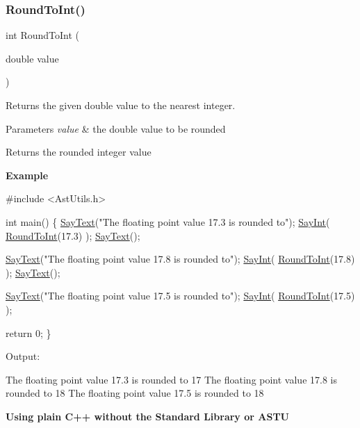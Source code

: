 \subsubsection{\texorpdfstring{Round\+To\+Int()}{RoundToInt()}}
{\footnotesize\ttfamily int Round\+To\+Int (\begin{DoxyParamCaption}\item[{double}]{value }\end{DoxyParamCaption})}

Returns the given double value to the nearest integer.


\begin{DoxyParams}{Parameters}
{\em value} & the double value to be rounded \\
\hline
\end{DoxyParams}
\begin{DoxyReturn}{Returns}
the rounded integer value
\end{DoxyReturn}
{\bfseries Example}


\begin{DoxyCode}
\textcolor{preprocessor}{#include <AstUtils.h>}

\textcolor{keywordtype}{int} main()
\{
  \hyperlink{group__io__group_ga82cdf45375c3b92b2a60c3d9b55d682f}{SayText}(\textcolor{stringliteral}{"The floating point value 17.3 is rounded to"});
  \hyperlink{group__io__group_gaa78da65e44d9ab5e70c79ed77f62b86a}{SayInt}( \hyperlink{group__math__group_ga06bd02ff0de83d2713683574ac288fb3}{RoundToInt}(17.3) );
  \hyperlink{group__io__group_ga82cdf45375c3b92b2a60c3d9b55d682f}{SayText}();

  \hyperlink{group__io__group_ga82cdf45375c3b92b2a60c3d9b55d682f}{SayText}(\textcolor{stringliteral}{"The floating point value 17.8 is rounded to"});
  \hyperlink{group__io__group_gaa78da65e44d9ab5e70c79ed77f62b86a}{SayInt}( \hyperlink{group__math__group_ga06bd02ff0de83d2713683574ac288fb3}{RoundToInt}(17.8) );
  \hyperlink{group__io__group_ga82cdf45375c3b92b2a60c3d9b55d682f}{SayText}();

  \hyperlink{group__io__group_ga82cdf45375c3b92b2a60c3d9b55d682f}{SayText}(\textcolor{stringliteral}{"The floating point value 17.5 is rounded to"});
  \hyperlink{group__io__group_gaa78da65e44d9ab5e70c79ed77f62b86a}{SayInt}( \hyperlink{group__math__group_ga06bd02ff0de83d2713683574ac288fb3}{RoundToInt}(17.5) );

  \textcolor{keywordflow}{return} 0;
\}
\end{DoxyCode}


Output\+: 
\begin{DoxyCode}
The floating point value 17.3 is rounded to
17
The floating point value 17.8 is rounded to
18
The floating point value 17.5 is rounded to
18
\end{DoxyCode}
 {\bfseries Using plain C++ without the Standard Library or A\+S\+TU}

